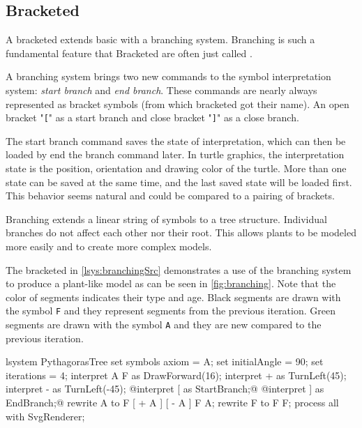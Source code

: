 \subsection{Bracketed \lsystems}

A bracketed \lsystems\cite[p.~24]{PL91} extends basic \dzerolsystem with a branching system.
Branching is such a fundamental feature that Bracketed \lsystems are often just called \lsystems.

A branching system brings two new commands to the symbol interpretation system: \emph{start branch} and \emph{end branch}.
These commands are nearly always represented as bracket symbols (from which bracketed \lsystems got their name).
An open bracket "\texttt{[}" as a start branch and close bracket "\texttt{]}" as a close branch.

The start branch command saves the state of interpretation, which can then be loaded by end the branch command later.
In turtle graphics, the interpretation state is the position, orientation and drawing color of the turtle.
More than one state can be saved at the same time, and the last saved state will be loaded first.
This behavior seems natural and could be compared to a pairing of brackets.

Branching extends a linear string of symbols to a tree structure.
Individual branches do not affect each other nor their root.
This allows plants to be modeled more easily and to create more complex models.

The bracketed \lsystem in \autoref{lsys:branchingSrc} demonstrates a use of the branching system to produce a plant-like model as can be seen in \autoref{fig:branching}.
Note that the color of segments indicates their type and age.
Black segments are drawn with the symbol \texttt{F} and they represent segments from the previous iteration.
Green segments are drawn with the symbol \texttt{A} and they are new compared to the previous iteration.

\begin{Lsystem}[label=lsys:branchingSrc,caption={A bracketed \lsystem that which creates a plant-like model (\autoref{fig:branching})}]
lsystem PythagorasTree {
	set symbols axiom = A;
	set initialAngle = 90;
	set iterations = 4;	
	interpret A F as DrawForward(16);
	interpret + as TurnLeft(45);
	interpret - as TurnLeft(-45);
	@interpret [ as StartBranch;@
	@interpret ] as EndBranch;@
	rewrite A to F [ + A ] [ - A ] F A;
	rewrite F to F F;
}
process all with SvgRenderer;
\end{Lsystem}

